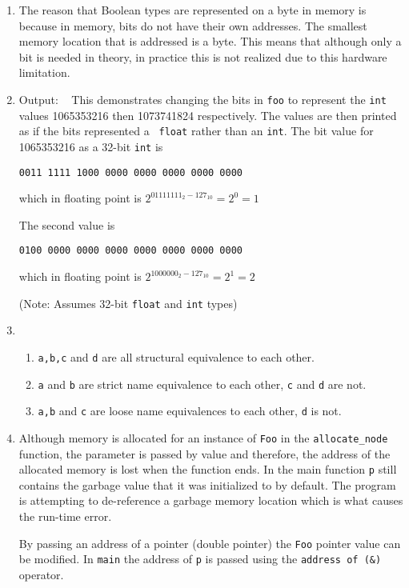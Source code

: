 \begin{enumerate}
\item

The reason that Boolean types are represented on a byte in memory is because in memory, bits do
not have their own addresses.  The smallest memory location that is addressed is a byte.  This
means that although only a bit is needed in theory, in practice this is not realized due to
this hardware limitation.

\item \hspace{1pt}



Output:
{\tt {}  \newline \newline
}
This demonstrates changing the bits in {\tt foo} to represent the {\tt int} values 1065353216
then 1073741824 respectively.  The values are then printed as if the bits represented a {\tt
float} rather than an {\tt int}.  The bit value for 1065353216 as a 32-bit {\tt int} is

{\tt 0011 1111 1000 0000 0000 0000 0000 0000}

which in floating point is $2^{01111111_2 - 127_{10}} = 2^0 = 1$

The second value is

{\tt 0100 0000 0000 0000 0000 0000 0000 0000}

which in floating point is $2^{1000000_2 - 127_{10}} = 2^1 = 2$

(Note: Assumes 32-bit {\tt float} and {\tt int} types)

\item
\begin{enumerate}
\item
{\tt a,b,c} and {\tt d} are all structural equivalence to each other.
\item
{\tt a} and {\tt b} are strict name equivalence to each other, {\tt c} and {\tt d} are not.
\item
{\tt a,b} and {\tt c} are loose name equivalences to each other, {\tt d} is not.

\end{enumerate}

\item
Although memory is allocated for an instance of {\tt Foo} in the {\tt allocate\_node} function,
the parameter is passed by value and therefore, the address of the allocated memory is lost when
the function ends.  In the main function {\tt p} still contains the garbage value that it was
initialized to by default. The program is attempting to de-reference a garbage memory location
which is what causes the run-time error.



By passing an address of a pointer (double pointer) the {\tt Foo} pointer value can be modified.
In {\tt main} the address of {\tt p} is passed using the {\tt address of (\&)} operator.

\end{enumerate}
